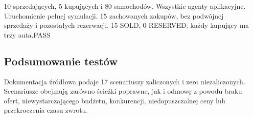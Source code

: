 {10 sprzedających, 5 kupujących i 80 samochodów.}
{Wszystkie agenty aplikacyjne.}
{Uruchomienie pełnej symulacji.}
{15 zachowanych zakupów, bez podwójnej sprzedaży i pozostałych rezerwacji.}
{15 SOLD, 0 RESERVED; każdy kupujący ma trzy auta.}{PASS}

\subsection{Podsumowanie testów}
Dokumentacja źródłowa podaje 17 scenariuszy zaliczonych i zero niezaliczonych.
Scenariusze obejmują zarówno ścieżki poprawne, jak i odmowę z powodu
braku ofert, niewystarczającego budżetu, konkurencji, niedopuszczalnej
ceny lub przekroczenia czasu zwrotu.

